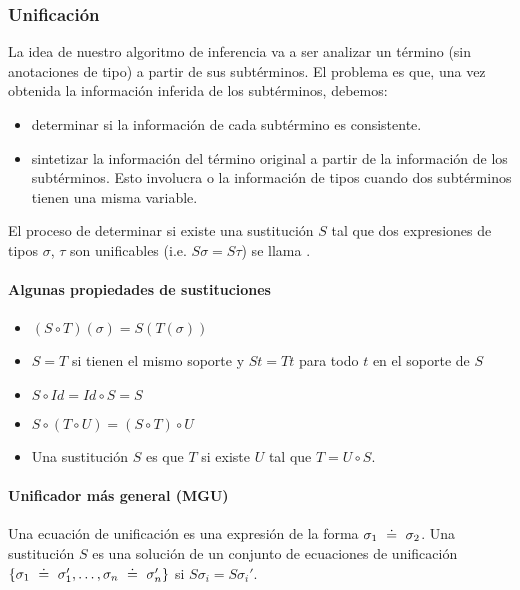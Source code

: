 \subsubsection{Unificación}

La idea de nuestro algoritmo de inferencia va a ser analizar un término (sin anotaciones de tipo) a partir de sus subtérminos. El problema es que, una vez obtenida la información inferida de los subtérminos, debemos:
\begin{itemize}
  \item {} determinar si la información de cada subtérmino es consistente.
  \item {} sintetizar la información del término original a partir de la información de los subtérminos. Esto involucra  o  la información de tipos cuando dos subtérminos tienen una misma variable.
\end{itemize}

El proceso de determinar si existe una sustitución $S$ tal que dos expresiones de tipos $\sigma$, $\tau$ son unificables (i.e. $S\sigma = S\tau$) se llama .

\paragraph{Algunas propiedades de sustituciones}

\begin{itemize}
  \item {} $(S \circ T)(\sigma) = S(T(\sigma))$
  \item {} $S = T$ si tienen el mismo soporte y $St = Tt$ para todo $t$ en el soporte de $S$
  \item $S \circ Id = Id \circ S = S$
  \item $S \circ (T \circ U) = (S \circ T) \circ U$
  \item Una sustitución $S$ es  que $T$ si existe $U$ tal que $T = U \circ S$.
\end{itemize}

\paragraph{Unificador más general (MGU)}

Una ecuación de unificación es una expresión de la forma $\sigma_1 \uni \sigma_2$. Una sustitución $S$ es una solución de un conjunto de ecuaciones de unificación $\{\sigma_1 \uni \sigma_1', \dots, \sigma_n \uni \sigma_n'\}$ si $S\sigma_i = S\sigma_i'$.


